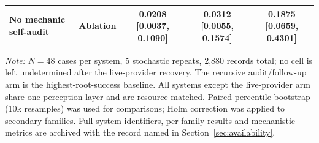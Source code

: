 \begin{table}[t]
\begin{tabular}{>{\raggedright\arraybackslash}p{3.05cm}lccc}
    No mechanic self-audit & Ablation & 0.0208 [0.0037, 0.1090] & 0.0312 [0.0055, 0.1574] & 0.1875 [0.0659, 0.4301] \\
    \bottomrule
  \end{tabular}
  \par\smallskip
  \textit{Note:} $N=48$ cases per system, 5 stochastic repeats, 2,880 records total; no cell is left undetermined after the live-provider recovery. The recursive audit/follow-up arm is the highest-root-success baseline. All systems except the live-provider arm share one perception layer and are resource-matched. Paired percentile bootstrap (10k resamples) was used for comparisons; Holm correction was applied to secondary families. Full system identifiers, per-family results and mechanistic metrics are archived with the record named in Section~\ref{sec:availability}.
\end{table}
